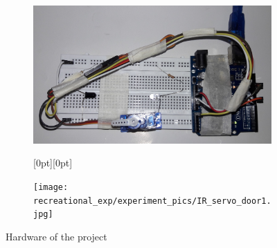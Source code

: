 \begin{figure}[H]
\centering
\begin{subfigure}[b]{0.45\textwidth}
    \centering
    \includegraphics[angle=90, width=\linewidth, height = 0.2\textheight]{Figures/recreational_exp/experiment_pics/IR_servo_door.jpg}
    \end{subfigure}
    \begin{subfigure}[b]{0.45\textwidth}
    \centering
    \raisebox{8mm}[0pt][0pt]
    {
        \parbox[t]{\textwidth}{\texttt{[image: recreational\_exp/experiment\_pics/IR\_servo\_door1.jpg]}}
    }
\end{subfigure}
\caption{Hardware of the project}
\end{figure}
